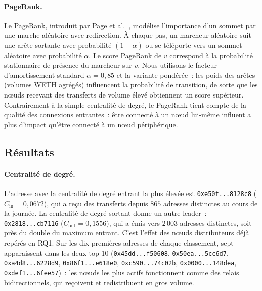\paragraph{PageRank.}
Le PageRank, introduit par Page et al.~\cite{page1999pagerank}, mod\'elise l'importance d'un sommet par une marche al\'eatoire avec redirection. \`A chaque pas, un marcheur al\'eatoire suit une ar\^ete sortante avec probabilit\'e $(1 - \alpha)$ ou se t\'el\'eporte vers un sommet al\'eatoire avec probabilit\'e $\alpha$. Le score PageRank de $v$ correspond \`a la probabilit\'e stationnaire de pr\'esence du marcheur sur $v$. Nous utilisons le facteur d'amortissement standard $\alpha = 0{,}85$ et la variante pond\'er\'ee~: les poids des ar\^etes (volumes WETH agr\'eg\'es) influencent la probabilit\'e de transition, de sorte que les n\oe{}uds recevant des transferts de volume \'elev\'e obtiennent un score sup\'erieur. Contrairement \`a la simple centralit\'e de degr\'e, le PageRank tient compte de la qualit\'e des connexions entrantes~: \^etre connect\'e \`a un n\oe{}ud lui-m\^eme influent a plus d'impact qu'\^etre connect\'e \`a un n\oe{}ud p\'eriph\'erique.

\subsection{R\'esultats}
\label{sec:rq2_resultats}

\paragraph{Centralit\'e de degr\'e.}
L'adresse avec la centralit\'e de degr\'e entrant la plus \'elev\'ee est \texttt{0xe50f...8128c8} ($C_{\text{in}} = 0{,}0672$), qui a re\c{c}u des transferts depuis $865$ adresses distinctes au cours de la journ\'ee. La centralit\'e de degr\'e sortant donne un autre leader~: \texttt{0x2818...cb7116} ($C_{\text{out}} = 0{,}1556$), qui a \'emis vers $2\,003$ adresses distinctes, soit pr\`es du double du maximum entrant. C'est l'effet des n\oe{}uds distributeurs d\'ej\`a rep\'er\'es en RQ1. Sur les dix premi\`eres adresses de chaque classement, sept apparaissent dans les deux top-10 (\texttt{0x45dd...f50608}, \texttt{0x50ea...5cc6d7}, \texttt{0xa4d8...6228d9}, \texttt{0x86f1...e618e0}, \texttt{0xc590...74c02b}, \texttt{0x0000...148dea}, \texttt{0xdef1...6fee57})~: les n\oe{}uds les plus actifs fonctionnent comme des relais bidirectionnels, qui re\c{c}oivent et redistribuent en gros volume.

